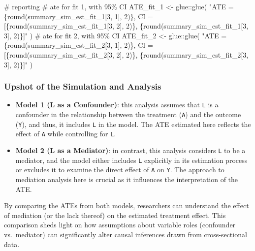 \documentclass[
  singlecolumn]{article}
\newenvironment{Shaded}{}{}
\newcommand{\CommentTok}[1]{\textcolor[rgb]{0.42,0.45,0.49}{#1}}
\newcommand{\FunctionTok}[1]{\textcolor[rgb]{0.44,0.26,0.76}{#1}}
\newcommand{\NormalTok}[1]{\textcolor[rgb]{0.14,0.16,0.18}{#1}}
\newcommand{\OtherTok}[1]{\textcolor[rgb]{0.44,0.26,0.76}{#1}}
\newcommand{\SpecialCharTok}[1]{\textcolor[rgb]{0.00,0.36,0.77}{#1}}
\newcommand{\StringTok}[1]{\textcolor[rgb]{0.01,0.18,0.38}{#1}}
\begin{document}
\begin{Shaded}
\begin{Highlighting}[]
\CommentTok{\# reporting }
\CommentTok{\# ate for fit 1, with 95\% CI}
\NormalTok{ATE\_fit\_1 }\OtherTok{\textless{}{-}}\NormalTok{ glue}\SpecialCharTok{::}\FunctionTok{glue}\NormalTok{(}
  \StringTok{"ATE =}
\StringTok{                        \{round(summary\_sim\_est\_fit\_1[3, 1], 2)\},}
\StringTok{                        CI = [\{round(summary\_sim\_est\_fit\_1[3, 2], 2)\},}
\StringTok{                        \{round(summary\_sim\_est\_fit\_1[3, 3], 2)\}]"}
\NormalTok{)}
\CommentTok{\# ate for fit 2, with 95\% CI}
\NormalTok{ATE\_fit\_2 }\OtherTok{\textless{}{-}}
\NormalTok{  glue}\SpecialCharTok{::}\FunctionTok{glue}\NormalTok{(}
    \StringTok{"ATE = \{round(summary\_sim\_est\_fit\_2[3, 1], 2)\},}
\StringTok{                        CI = [\{round(summary\_sim\_est\_fit\_2[3, 2], 2)\},}
\StringTok{                        \{round(summary\_sim\_est\_fit\_2[3, 3], 2)\}]"}
\NormalTok{  )}
\end{Highlighting}
\end{Shaded}

\subsubsection{Upshot of the Simulation and
Analysis}\label{upshot-of-the-simulation-and-analysis}

\begin{itemize}
\item
  \textbf{Model 1 (L as a Confounder)}: this analysis assumes that
  \texttt{L} is a confounder in the relationship between the treatment
  (\texttt{A}) and the outcome (\texttt{Y}), and thus, it includes
  \texttt{L} in the model. The ATE estimated here reflects the effect of
  \texttt{A} while controlling for \texttt{L}.
\item
  \textbf{Model 2 (L as a Mediator)}: in contrast, this analysis
  considers \texttt{L} to be a mediator, and the model either includes
  \texttt{L} explicitly in its estimation process or excludes it to
  examine the direct effect of \texttt{A} on \texttt{Y}. The approach to
  mediation analysis here is crucial as it influences the interpretation
  of the ATE.
\end{itemize}

By comparing the ATEs from both models, researchers can understand the
effect of mediation (or the lack thereof) on the estimated treatment
effect. This comparison sheds light on how assumptions about variable
roles (confounder vs.~mediator) can significantly alter causal
inferences drawn from cross-sectional data.
\end{document}
